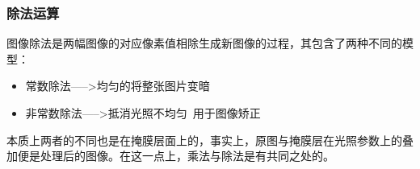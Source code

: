 \documentclass[11pt]{article}
\begin{document}
    \begin{center}
    \end{center}
    
    \begin{center}
    \end{center}
    
    \subsubsection{除法运算}
图像除法是两幅图像的对应像素值相除生成新图像的过程，其包含了两种不同的模型：
\begin{itemize}
	\item 常数除法----->均匀的将整张图片变暗
	\item 非常数除法----->抵消光照不均匀\ 用于图像矫正
\end{itemize}
本质上两者的不同也是在掩膜层面上的，事实上，原图与掩膜层在光照参数上的叠加便是处理后的图像。在这一点上，乘法与除法是有共同之处的。
    
\end{document}
